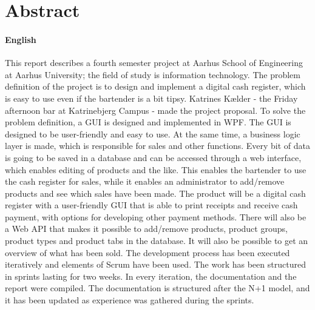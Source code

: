 \chapter{Abstract}

\subsubsection*{English}

This report describes a fourth semester project at Aarhus School of Engineering at Aarhus University; 
the field of study is information technology. 
The problem definition of the project is to design and implement a digital cash register, which is easy to use even if the bartender is a bit tipsy. 
Katrines Kælder - the Friday afternoon bar at Katrinebjerg Campus - made the project proposal.
\newline
\newline
To solve the problem definition, a \gls{GUI} is designed and implemented in \gls{WPF}. 
The \gls{GUI} is designed to be user-friendly and easy to use.
At the same time, a business logic layer is made, which is responsible for sales and other functions. 
Every bit of data is going to be saved in a database and can be accessed through a web interface, which enables editing of products and the like. 
This enables the bartender to use the cash register for sales, while it enables an administrator to add/remove products and see which sales have been made. 
\newline
\newline
The product will be a digital cash register with a user-friendly \gls{GUI} that is able to print receipts and receive cash payment, with options for developing other payment methods. 
There will also be a \gls{Web API} that makes it possible to add/remove products, product groups, product types and product tabs in the database. 
It will also be possible to get an overview of what has been sold. 
\newline
\newline
The development process has been executed iteratively and elements of Scrum have been used. 
The work has been structured in sprints lasting for two weeks. 
In every iteration, the documentation and the report were compiled. 
The documentation is structured after the N+1 model, and it has been updated as experience was gathered during the sprints. 